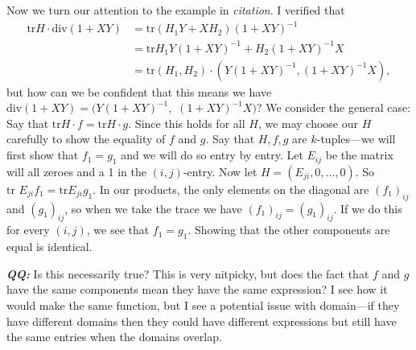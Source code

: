 \documentclass[12pt]{exam}
\begin{document}
\noindent Now we turn our attention to the example in \emph{citation}. I verified that
\begin{align*}
  \text{tr} H \cdot \text{div} \left( 1+XY \right)
    &= \text{tr} \left( H_1 Y+X H_2 \right)(1+XY) ^{-1}\\
    &= \text{tr} H_1Y(1+XY) ^{-1} + H_2(1+XY) ^{-1} X \\
    &= \text{tr} \left( H_1,H_2 \right) \cdot \left( Y(1+XY) ^{-1} , \left( 1+XY \right) ^{-1}X \right),
\end{align*}
but how can we be confident that this means we have
$\text{div} \left( 1+XY \right) = ( Y(1+XY) ^{-1} ,$ $ \left( 1+XY \right) ^{-1}X)$?
We consider the general case: Say that
$\text{tr} H \cdot f = \text{tr} H \cdot g$. Since this holds for all $H$, we
may choose our $H$ carefully to show the equality of $f$ and $g$. Say that $H,f,g$
are $k$-tuples---we will first show that $f_1=g_1$ and we will do so entry by
entry. Let $E_{ij}$ be the matrix will all zeroes and a 1 in the $(i,j)$-entry.
Now let $H= (E_{ji},0, \dots ,0)$. So $\text{tr } E_{ji}f_1 = \text{tr
} E_{ji}g_1$. In our products, the only elements on the diagonal are
$(f_1)_{ij}$ and $(g_1)_{ij}$, so when we take the trace we have
$(f_1)_{ij} =(g_1)_{ij}$. If we do this for every $(i,j)$, we see that
$f_1=g_1$. Showing that the other components are equal is identical.

\emph{\bf QQ:} Is this necessarily true? This is very nitpicky, but does the fact
that $f$ and $g$ have the same components mean they have the same expression? I
see how it would make the same function, but I see a potential issue with
domain---if they have different domains then they could have different
expressions but still have the same entries when the domains overlap.
\end{document}
